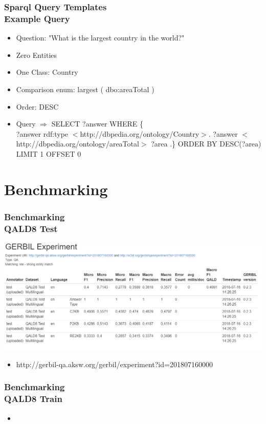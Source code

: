\documentclass{beamer}
\newcommand\tab[1][1cm]{\hspace*{#1}}
\begin{document}
\begin{frame}
\frametitle{Sparql Query Templates \\ {\normalsize Example Query}}
\begin{example}[largest]
	\begin{itemize}
		\item Question: "What is the largest country in the world?"
		\item Zero Entities
		\item One Class: Country
		\item Comparison enum: largest ( dbo:areaTotal )
		\item Order: DESC 
		\item Query $\Rightarrow$ SELECT ?answer WHERE \{ \\
		\tab[1.4cm] 	?answer rdf:type $<$http://dbpedia.org/ontology/Country$>$. 
		\tab[1.4cm] 	?answer  $<$http://dbpedia.org/ontology/areaTotal$>$ ?area .\} 
		\tab[1.4cm] 	ORDER BY DESC(?area) LIMIT 1 OFFSET 0

	\end{itemize}
\end{example}
\end{frame}


\section{Benchmarking}

\begin{frame}
\frametitle{Benchmarking \\ {\normalsize QALD8 Test}}
\begin{center}
	\includegraphics[scale=0.38]{QALD-8-Test.PNG}
\end{center}

\begin{itemize}
	\item  http://gerbil-qa.aksw.org/gerbil/experiment?id=201807160000
\end{itemize}
\end{frame}

\begin{frame}
\frametitle{Benchmarking \\ {\normalsize QALD8 Train}}
\begin{center}

\end{center}

\begin{itemize}
	\item  
\end{itemize}
\end{frame}
\end{document}
